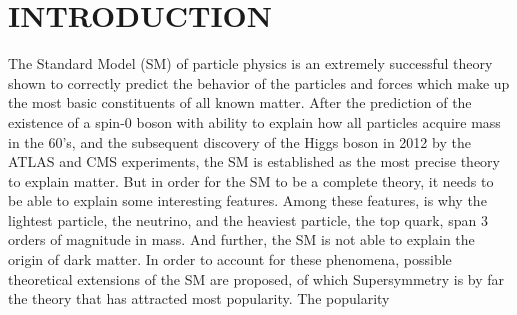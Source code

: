 \chapter{INTRODUCTION} \label{}

The Standard Model (SM) of particle physics is an extremely successful theory shown to correctly predict the behavior of the particles and forces which make up the most basic constituents of all known matter. After the prediction of the existence of a spin-0 boson with ability to explain how all particles acquire mass in the 60's, and the subsequent discovery of the Higgs boson in 2012 by the ATLAS and CMS experiments, the SM is established as the most precise theory to explain matter. 
But in order for the SM to be a complete theory, it needs to be able to explain some interesting features. Among these features, is why the lightest particle, the neutrino, and the heaviest particle, the top quark, span 3 orders of magnitude in mass. And further, the SM is not able to explain the origin of dark matter. In order to account for these phenomena, possible theoretical extensions of the SM are proposed, of which Supersymmetry is by far the theory that has attracted most popularity. The popularity     

